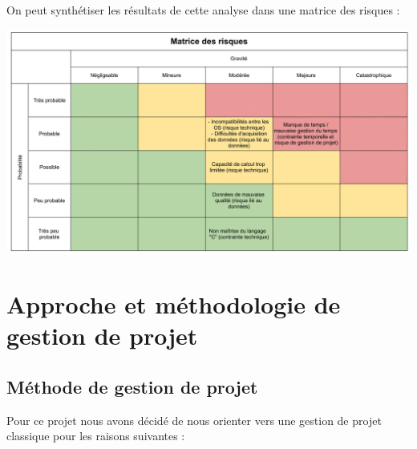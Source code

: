 \documentclass[a4paper, 12pt]{report}
\begin{document}
On peut synthétiser les résultats de cette analyse dans une matrice des risques :

\begin{center}
    \includegraphics[width = \textwidth]{IMG/mat_risques.png}
\end{center}
\clearpage

    \section{Approche et méthodologie de gestion de projet}
        
        \subsection{Méthode de gestion de projet}

Pour ce projet nous avons décidé de nous orienter vers une gestion de projet classique pour les raisons suivantes :
\bigskip
\end{document}
